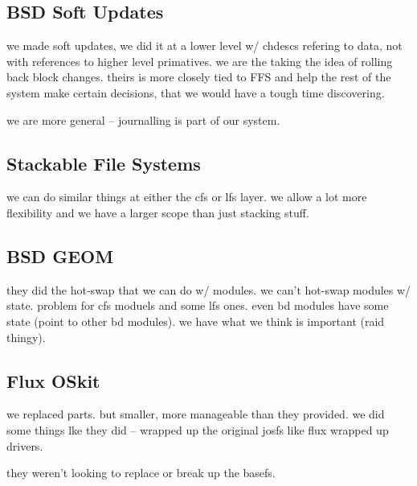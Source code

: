 \subsection{BSD Soft Updates}

we made soft updates, we did it at a lower level w/ chdescs refering to
data, not with references to higher level primatives. we are the
taking the idea of rolling back block changes. theirs is more closely
tied to FFS and help the rest of the system make certain decisions,
that we would have a tough time discovering.

we are more general -- journalling is part of our system.

\subsection{Stackable File Systems}

we can do similar things at either the cfs or lfs layer. we allow a
lot more flexibility and we have a larger scope than just stacking
stuff.

\subsection{BSD GEOM}

they did the hot-swap that we can do w/ modules. we can't hot-swap
modules w/ state. problem for cfs moduels and some lfs ones. even bd
modules have some state (point to other bd modules). we have what we
think is important (raid thingy).

\subsection{Flux OSkit}

we replaced parts. but smaller, more manageable than they provided. we
did some things lke they did -- wrapped up the original josfs like
flux wrapped up drivers.

they weren't looking to replace or break up the basefs.
